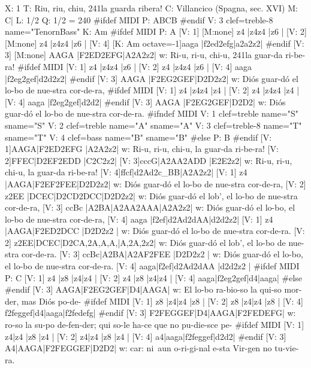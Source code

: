 \documentclass[a4paper,12pt]{book}
\begin{document}
{\footnotesize
\begin{abcsource}
X: 1
T: Riu, riu, chiu, \bl{}241la guarda ribera!
C: Villancico (Spagna, sec. XVI)
M: C|
L: 1/2
Q: 1/2 = 240
#ifdef MIDI
P: ABCB
#endif
V: 3 clef=treble-8 name="Tenor\bl{}nBass"
K: Am
#ifdef MIDI
P: A
[V: 1] [M:none] z4               |z4z4    |z6    |
[V: 2] [M:none] z4               |z4z4    |z6    |
[V: 4] [K: Am octave=-1]\bl
[M:none] aaga             |f2ed2efg|a2a2z2|
#endif
[V: 3] [M:none] AAGA             |F2ED2EFG|A2A2z2|
w: Ri-u, ri-u, chi-u, \bl{}241la guar-da ri-be-ra!
%
#ifdef MIDI
[V: 1] z4               |z4z4    |z6    |
[V: 2] z4               |z4z4    |z6    |
[V: 4] aaga             |f2eg2gef|d2d2z2|
#endif
[V: 3] AAGA             |F2EG2GEF|D2D2z2|
w: Di\'os guar-d\'o el lo-bo de nue-stra cor-de-ra,
%
#ifdef MIDI
[V: 1] z4               |z4z4    |z4  |
[V: 2] z4               |z4z4    |z4  |
[V: 4] aaga             |f2eg2gef|d2d2|
#endif
[V: 3] AAGA             |F2EG2GEF|D2D2|
w: Di\'os guar-d\'o el lo-bo de nue-stra cor-de-ra.
#ifndef MIDI
V: 1 clef=treble   name="S" sname="S"
V: 2 clef=treble   name="A" sname="A"
V: 3 clef=treble-8 name="T" sname="T"
V: 4 clef=bass     name="B" sname="B"
#else
P: B
#endif
[V: 1]AAGA|F2ED2EFG |A2A2z2|
w: Ri-u, ri-u, chi-u, la guar-da ri-be-ra!
[V: 2]FFEC|D2EF2EDD |C2C2z2|
[V: 3]cccG|A2AA2ADD |E2E2z2|
w: Ri-u, ri-u, chi-u, la guar-da ri-be-ra!
[V: 4]ffcf|d2Ad2c_BB|A2A2z2|
%
[V: 1] z4      |AAGA|F2EF2FEE|D2D2z2|
w: Di\'os guar-d\'o el lo-bo de nue-stra cor-de-ra,
[V: 2] z2EE    |DCEC|D2CD2DCC|D2D2z2|
w: Di\'os guar-d\'o el lob', el lo-bo de nue-stra cor-de-ra,
[V: 3] ccBc    |A2BA|A2AA2AAA|A2A2z2|
w: Di\'os guar-d\'o el lo-bo, el lo-bo de nue-stra cor-de-ra,
[V: 4] aaga    |f2ef|d2Ad2dAA|d2d2z2|
%
[V: 1] z4  |AAGA|F2ED2DCC    |D2D2z2  |
w: Di\'os guar-d\'o el lo-bo de nue-stra cor-de-ra.
[V: 2] z2EE|DCEC|D2CA,2A,A,A,|A,2A,2z2|
w: Di\'os guar-d\'o el lob', el lo-bo de nue-stra cor-de-ra.
[V: 3] ccBc|A2BA|A2AF2FEE    |D2D2z2  |
w: Di\'os guar-d\'o el lo-bo, el lo-bo de nue-stra cor-de-ra.
[V: 4] aaga|f2ef|d2Ad2dAA    |d2d2z2  |
#ifdef MIDI
P: C
[V: 1] z4  |z8      |z4|z4  |
[V: 2] z4  |z8      |z4|z4  |
[V: 4] aaga|f2eg2gef|d4|aaga|
#else
#endif
[V: 3] AAGA|F2EG2GEF|D4|AAGA|
w: El lo-bo ra-bio-so la qui-so mor-der, mas Di\'os po-de-
%
#ifdef MIDI
[V: 1] z8      |z4|z4  |z8      |
[V: 2] z8      |z4|z4  |z8      |
[V: 4] f2feggef|d4|aaga|f2fedefg|
#endif
[V: 3] F2FEGGEF|D4|AAGA|F2FEDEFG|
w: ro-so la su-po de-fen-der; qui so-le ha-ce que no pu-die-sce pe-
%
#ifdef MIDI
[V: 1] z4|z4  |z8      |z4  |
[V: 2] z4|z4  |z8      |z4  |
[V: 4] a4|aaga|f2feggef|d2d2|
#endif
[V: 3] A4|AAGA|F2FEGGEF|D2D2|
w: car: ni~aun o-ri-gi-nal e-sta Vir-gen no tu-vie-ra.
\end{abcsource}
}
\end{document}
